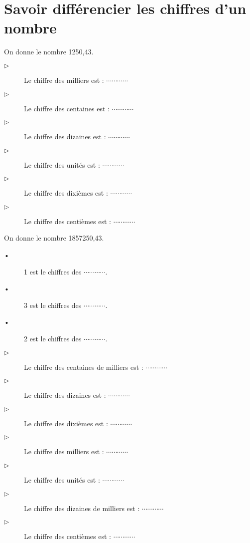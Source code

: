 








\section{Savoir différencier les chiffres d'un nombre}


On donne le  nombre 1250,43. 
\begin{description}
\item[$\triangleright$] Le chiffre des milliers est : $ \cdots\cdots\cdots\cdots $
\item[$\triangleright$] Le chiffre des centaines est : $ \cdots\cdots\cdots\cdots $
\item[$\triangleright$] Le chiffre des dizaines est : $ \cdots\cdots\cdots\cdots $
\item[$\triangleright$] Le chiffre des unités est : $ \cdots\cdots\cdots\cdots $
\item[$\triangleright$] Le chiffre des dixièmes est : $ \cdots\cdots\cdots\cdots $
\item[$\triangleright$] Le chiffre des centièmes est : $ \cdots\cdots\cdots\cdots $
\end{description}



On donne le  nombre 1857250,43. 
\begin{description}
\item[•] 1 est le chiffres des $ \cdots\cdots\cdots\cdots $.
\item[•] 3 est le chiffres des $ \cdots\cdots\cdots\cdots $.
\item[•] 2 est le chiffres des $ \cdots\cdots\cdots\cdots $.

\item[$\triangleright$] Le chiffre des centaines de milliers est : $ \cdots\cdots\cdots\cdots $
\item[$\triangleright$] Le chiffre des dizaines est : $ \cdots\cdots\cdots\cdots $
\item[$\triangleright$] Le chiffre des dixièmes est : $ \cdots\cdots\cdots\cdots $
\item[$\triangleright$] Le chiffre des milliers est :  $ \cdots\cdots\cdots\cdots $
\item[$\triangleright$] Le chiffre des unités est : $ \cdots\cdots\cdots\cdots $
\item[$\triangleright$] Le chiffre des dizaines de milliers est : $ \cdots\cdots\cdots\cdots $
\item[$\triangleright$] Le chiffre des centièmes est : $ \cdots\cdots\cdots\cdots $

\end{description}







